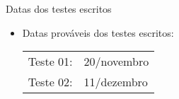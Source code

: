 \documentclass[
size=17pt,
paper=smartboard,
mode=present,
display=slidesnotes,
style=paintings,
nopagebreaks,
blackslide,
fleqn]{powerdot}
\begin{document}
      \begin{slide}[toc=]{Datas dos testes escritos}
         \begin{itemize}
            \item Datas prováveis dos testes escritos:
            \begin{table}
               \centering
               \begin{tabular}{|l l|}
                  \hline
                  Teste 01: & 20/novembro\\
                  Teste 02: & 11/dezembro\\
                  \hline
               \end{tabular}
            \end{table}
         \end{itemize}
      \end{slide}
\end{document}
